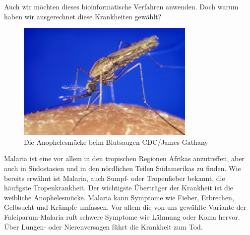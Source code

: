 \documentclass[11pt]{article}
\begin{document}
    Auch wir möchten dieses bioinformatische Verfahren anwenden. Doch warum haben wir ausgerechnet diese Krankheiten gewählt?

    \begin{figure}
        \includegraphics[width=\linewidth]{Anophelesmucke}
        \caption{Die Anophelesmücke beim Blutsaugen CDC/James Gathany}
    \end{figure}
    Malaria ist eine vor allem in den tropischen Regionen Afrikas anzutreffen, aber auch in Südostasien und in den nördlichen Teilen Südamerikas zu finden. Wie bereits erwähnt ist Malaria, auch Sumpf- oder Tropenfieber bekannt, die häufigste Tropenkrankheit. Der wichtigste Überträger der Krankheit ist die weibliche Anophelesmücke. Malaria kann Symptome wie Fieber, Erbrechen, Gelbsucht und Krämpfe umfassen. Vor allem die von uns gewählte Variante der Falciparum-Malaria ruft schwere Symptome wie Lähmung oder Koma hervor. Über Lungen- oder Nierenversagen führt die Krankheit zum Tod.
\end{document}
